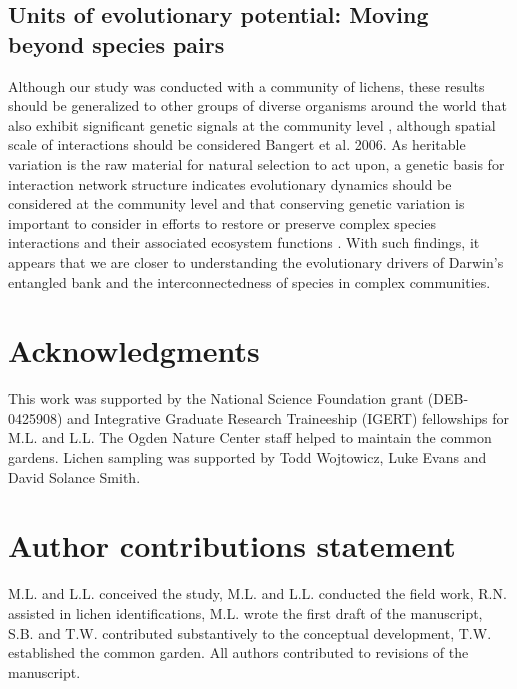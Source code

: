 \documentclass[fleqn,10pt]{wlscirep}
\begin{document}
\subsection{Units of evolutionary potential: Moving beyond species pairs}


Although our study was conducted with a community of lichens, these
results should be generalized to other groups of diverse organisms
around the world that also exhibit significant genetic signals at the
community level \cite{Rowntree2011, Whitham2012}, although spatial
scale of interactions should be considered \cite{Zook2010} Bangert et
al. 2006. As heritable variation is the raw material for natural
selection to act upon, a genetic basis for interaction network
structure indicates evolutionary dynamics should be considered at the
community level and that conserving genetic variation is important to
consider in efforts to restore or preserve complex species
interactions and their associated ecosystem functions
\cite{Evans2013}.  With such findings, it appears that we are closer
to understanding the evolutionary drivers of Darwin's entangled bank
and the interconnectedness of species in complex communities.







\section*{Acknowledgments} 

This work was supported by the National Science Foundation grant
(DEB-0425908) and Integrative Graduate Research Traineeship (IGERT)
fellowships for M.L. and L.L. The Ogden Nature Center staff helped to
maintain the common gardens. Lichen sampling was supported by Todd
Wojtowicz, Luke Evans and David Solance Smith.


\section*{Author contributions statement}

M.L. and L.L. conceived the study, M.L. and L.L. conducted the field
work, R.N.  assisted in lichen identifications, M.L. wrote the first
draft of the manuscript, S.B. and T.W. contributed substantively to
the conceptual development, T.W. established the common garden. All
authors contributed to revisions of the manuscript.
\end{document}
